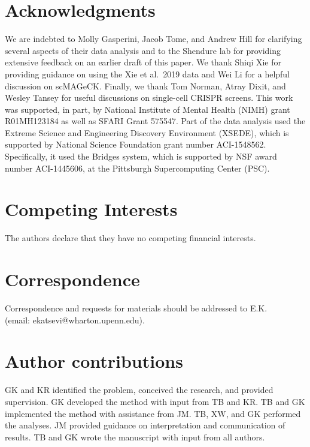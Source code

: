 \documentclass{article}
\begin{document}
\section*{Acknowledgments}
 We are indebted to Molly Gasperini, Jacob Tome, and Andrew Hill for clarifying several aspects of their data analysis\cite{Gasperini2019} and to the Shendure lab for providing extensive feedback on an earlier draft of this paper. We thank Shiqi Xie for providing guidance on using the Xie et al.\ 2019 data and Wei Li for a helpful discussion on scMAGeCK. Finally, we thank Tom Norman, Atray Dixit, and Wesley Tansey for useful discussions on single-cell CRISPR screens. This work was supported, in part, by National Institute of Mental Health (NIMH) grant R01MH123184 as well as SFARI Grant 575547. Part of the data analysis used the Extreme Science and Engineering Discovery Environment (XSEDE)\cite{XSEDE}, which is supported by National Science Foundation grant number ACI-1548562. Specifically, it used the Bridges system\cite{Bridges}, which is supported by NSF award number ACI-1445606, at the Pittsburgh Supercomputing Center (PSC). 

\section*{Competing Interests} The authors declare that they have no
competing financial interests.
\section*{Correspondence}
Correspondence and requests for materials
should be addressed to E.K. \\ (email: ekatsevi@wharton.upenn.edu).
\section*{Author contributions}
GK and KR identified the problem, conceived the research, and provided supervision. GK developed the method with input from TB and KR. TB and GK implemented the method with assistance from JM. TB, XW, and GK performed the analyses. JM provided guidance on interpretation and communication of results. TB and GK wrote the manuscript with input from all authors.
\end{document}
